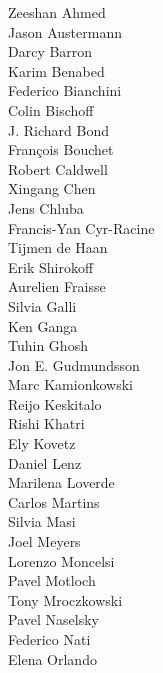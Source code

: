 \documentclass[PICOReport.tex]{subfiles}
\begin{document}
\footnotesize {

\begin{multicols}{4}
Zeeshan Ahmed                   \\
Jason Austermann                \\
Darcy Barron                    \\
Karim Benabed                   \\
Federico Bianchini              \\
Colin Bischoff                  \\
J. Richard Bond                 \\
Fran\c{c}ois Bouchet            \\
Robert Caldwell                 \\
Xingang Chen                    \\
Jens Chluba                     \\
Francis-Yan Cyr-Racine          \\
Tijmen de Haan                  \\
Erik Shirokoff                  \\
Aurelien Fraisse                \\
Silvia Galli                    \\
Ken Ganga                       \\
Tuhin Ghosh                     \\
Jon E. Gudmundsson              \\
Marc Kamionkowski               \\
Reijo Keskitalo                 \\
Rishi Khatri                    \\
Ely Kovetz                      \\
Daniel Lenz                     \\
Marilena Loverde                \\
Carlos Martins                  \\
Silvia Masi                     \\
Joel Meyers                     \\
Lorenzo Moncelsi                \\
Pavel Motloch                   \\
Tony Mroczkowski                \\
Pavel Naselsky                  \\
Federico Nati                   \\
Elena Orlando                   \\

\end{multicols}}
\end{document}
